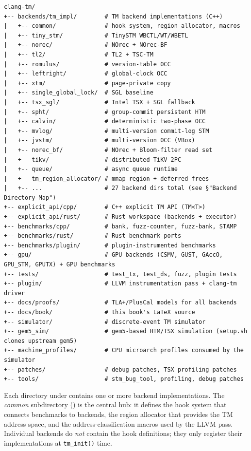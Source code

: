 \begin{verbatim}
clang-tm/
+-- backends/tm_impl/        # TM backend implementations (C++)
|   +-- common/              # hook system, region allocator, macros
|   +-- tiny_stm/            # TinySTM WBCTL/WT/WBETL
|   +-- norec/               # NOrec + NOrec-BF
|   +-- tl2/                 # TL2 + TSC-TM
|   +-- romulus/             # version-table OCC
|   +-- leftright/           # global-clock OCC
|   +-- xtm/                 # page-private copy
|   +-- single_global_lock/  # SGL baseline
|   +-- tsx_sgl/             # Intel TSX + SGL fallback
|   +-- spht/                # group-commit persistent HTM
|   +-- calvin/              # deterministic two-phase OCC
|   +-- mvlog/               # multi-version commit-log STM
|   +-- jvstm/               # multi-version OCC (VBox)
|   +-- norec_bf/            # NOrec + Bloom-filter read set
|   +-- tikv/                # distributed TiKV 2PC
|   +-- queue/               # async queue runtime
|   +-- tm_region_allocator/ # mmap region + deferred frees
|   +-- ...                  # 27 backend dirs total (see §"Backend Directory Map")
+-- explicit_api/cpp/        # C++ explicit TM API (TM<T>)
+-- explicit_api/rust/       # Rust workspace (backends + executor)
+-- benchmarks/cpp/          # bank, fuzz-counter, fuzz-bank, STAMP
+-- benchmarks/rust/         # Rust benchmark ports
+-- benchmarks/plugin/       # plugin-instrumented benchmarks
+-- gpu/                     # GPU backends (CSMV, GUST, GAccO, GPU_STM, GPUTX) + GPU benchmarks
+-- tests/                   # test_tx, test_ds, fuzz, plugin tests
+-- plugin/                  # LLVM instrumentation pass + clang-tm driver
+-- docs/proofs/             # TLA+/PlusCal models for all backends
+-- docs/book/               # this book's LaTeX source
+-- simulator/               # discrete-event TM simulator
+-- gem5_sim/                # gem5-based HTM/TSX simulation (setup.sh clones upstream gem5)
+-- machine_profiles/        # CPU microarch profiles consumed by the simulator
+-- patches/                 # debug patches, TSX profiling patches
+-- tools/                   # stm_bug_tool, profiling, debug patches
\end{verbatim}

Each directory under  contains one or more
backend implementations.  The \emph{common} subdirectory
() is the central hub: it defines the
hook system that connects benchmarks to backends, the region allocator
that provides the TM address space, and the address-classification macros
used by the LLVM pass.  Individual backends do \emph{not} contain
the hook definitions; they only register their implementations at
\texttt{tm\_init()} time.

